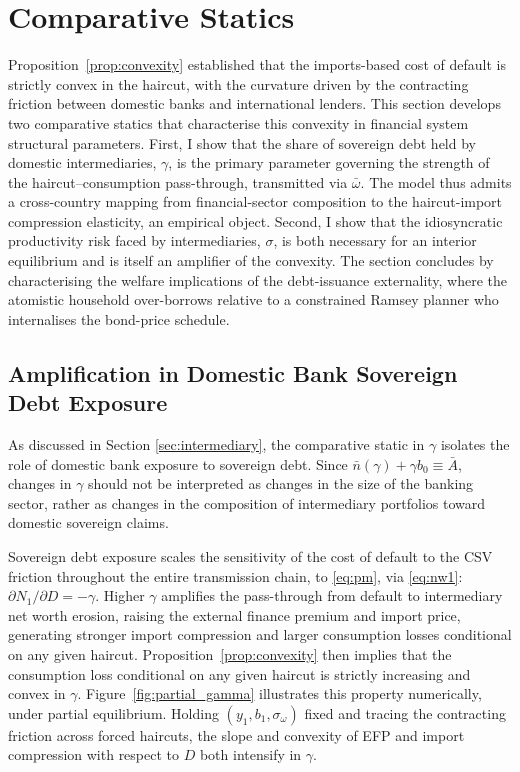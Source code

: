\documentclass[11pt]{article}
\theoremstyle{definition}
\theoremstyle{plain}
\theoremstyle{remark}
\begin{document}
\section{Comparative Statics}\label{sec:implications}

Proposition~\ref{prop:convexity} established that the imports-based cost of default is strictly convex in the haircut, with the curvature driven by the contracting friction between domestic banks and international lenders. This section develops two comparative statics that characterise this convexity in financial system structural parameters. First, I show that the share of sovereign debt held by domestic intermediaries, $\gamma$, is the primary parameter governing the strength of the haircut–consumption pass-through, transmitted via $\bar \omega$. The model thus admits a cross-country mapping from financial-sector composition to the haircut-import compression elasticity, an empirical object. Second, I show that the idiosyncratic productivity risk faced by intermediaries, $\sigma$, is both necessary for an interior equilibrium and is itself an amplifier of the convexity. The section concludes by characterising the welfare implications of the debt-issuance externality, where the atomistic household over-borrows relative to a constrained Ramsey planner who internalises the bond-price schedule.

\subsection{Amplification in Domestic Bank Sovereign Debt Exposure}\label{sec:comp_stat_gamma}

As discussed in Section \ref{sec:intermediary}, the comparative static in $\gamma$ isolates the role of domestic bank exposure to sovereign debt. Since $\bar n(\gamma)+\gamma b_0\equiv \bar A$, changes in $\gamma$ should not be interpreted as changes in the size of the banking sector, rather as changes in the composition of intermediary portfolios toward domestic sovereign claims.
 
Sovereign debt exposure scales the sensitivity of the cost of default to the CSV friction throughout the entire transmission chain, to \eqref{eq:pm}, via \eqref{eq:nw1}: $\partial N_1/\partial D = -\gamma$. Higher $\gamma$ amplifies the pass-through from default to intermediary net worth erosion, raising the external finance premium and import price, generating stronger import compression and larger consumption losses conditional on any given haircut. Proposition~\ref{prop:convexity} then implies that the consumption loss conditional on any given haircut is strictly increasing and convex in $\gamma$. Figure~\ref{fig:partial_gamma} illustrates this property numerically, under partial equilibrium. Holding $(y_1, b_1, \sigma_\omega)$ fixed and tracing the contracting friction across forced haircuts, the slope and convexity of EFP and import compression with respect to $D$ both intensify in $\gamma$.
\end{document}
